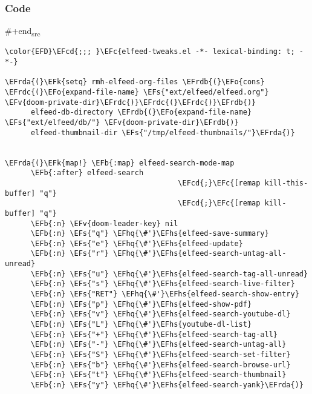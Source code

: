 \documentclass[a4wide,10pt]{article}
\newcommand{\EFc}[1]{\textcolor{EFc}{#1}} %
\newcommand{\EFcd}[1]{\textcolor{EFcd}{#1}} %
\newcommand{\EFs}[1]{\textcolor{EFs}{#1}} %
\newcommand{\EFk}[1]{\textcolor{EFk}{#1}} %
\newcommand{\EFb}[1]{\textcolor{EFb}{#1}} %
\newcommand{\EFv}[1]{\textcolor{EFv}{#1}} %
\newcommand{\EFo}[1]{\textcolor{EFo}{#1}} %
\newcommand{\EFhq}[1]{\textcolor{EFhq}{#1}} %
\newcommand{\EFhs}[1]{\textcolor{EFhs}{#1}} %
\newcommand{\EFrda}[1]{\textcolor{EFrda}{#1}} %
\newcommand{\EFrdb}[1]{\textcolor{EFrdb}{#1}} %
\newcommand{\EFrdc}[1]{\textcolor{EFrdc}{#1}} %
\begin{document}
\subsubsection{Code}
\label{sec:orgae676a8}
\#+end\textsubscript{src}
\begin{Code}
\begin{Verbatim}
\color{EFD}\EFcd{;;; }\EFc{elfeed-tweaks.el -*- lexical-binding: t; -*-}

\EFrda{(}\EFk{setq} rmh-elfeed-org-files \EFrdb{(}\EFo{cons} \EFrdc{(}\EFo{expand-file-name} \EFs{"ext/elfeed/elfeed.org"} \EFv{doom-private-dir}\EFrdc{)}\EFrdc{(}\EFrdc{)}\EFrdb{)}
      elfeed-db-directory \EFrdb{(}\EFo{expand-file-name} \EFs{"ext/elfeed/db/"} \EFv{doom-private-dir}\EFrdb{)}
      elfeed-thumbnail-dir \EFs{"/tmp/elfeed-thumbnails/"}\EFrda{)}


\EFrda{(}\EFk{map!} \EFb{:map} elfeed-search-mode-map
      \EFb{:after} elfeed-search
                                        \EFcd{;}\EFc{[remap kill-this-buffer] "q"}
                                        \EFcd{;}\EFc{[remap kill-buffer] "q"}
      \EFb{:n} \EFv{doom-leader-key} nil
      \EFb{:n} \EFs{"q"} \EFhq{\#'}\EFhs{elfeed-save-summary}
      \EFb{:n} \EFs{"e"} \EFhq{\#'}\EFhs{elfeed-update}
      \EFb{:n} \EFs{"r"} \EFhq{\#'}\EFhs{elfeed-search-untag-all-unread}
      \EFb{:n} \EFs{"u"} \EFhq{\#'}\EFhs{elfeed-search-tag-all-unread}
      \EFb{:n} \EFs{"s"} \EFhq{\#'}\EFhs{elfeed-search-live-filter}
      \EFb{:n} \EFs{"RET"} \EFhq{\#'}\EFhs{elfeed-search-show-entry}
      \EFb{:n} \EFs{"p"} \EFhq{\#'}\EFhs{elfeed-show-pdf}
      \EFb{:n} \EFs{"v"} \EFhq{\#'}\EFhs{elfeed-search-youtube-dl}
      \EFb{:n} \EFs{"L"} \EFhq{\#'}\EFhs{youtube-dl-list}
      \EFb{:n} \EFs{"+"} \EFhq{\#'}\EFhs{elfeed-search-tag-all}
      \EFb{:n} \EFs{"-"} \EFhq{\#'}\EFhs{elfeed-search-untag-all}
      \EFb{:n} \EFs{"S"} \EFhq{\#'}\EFhs{elfeed-search-set-filter}
      \EFb{:n} \EFs{"b"} \EFhq{\#'}\EFhs{elfeed-search-browse-url}
      \EFb{:n} \EFs{"t"} \EFhq{\#'}\EFhs{elfeed-search-thumbnail}
      \EFb{:n} \EFs{"y"} \EFhq{\#'}\EFhs{elfeed-search-yank}\EFrda{)}


\end{Verbatim}
\end{Code}
\end{document}
